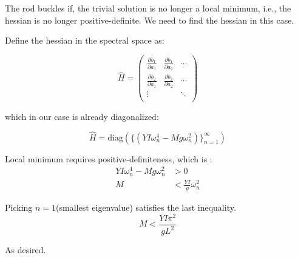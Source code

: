 \begin{framed}
The rod buckles if, the trivial solution is no longer a local minimum, i.e., the hessian is no longer positive-definite. We need to find the hessian in this case.

Define the hessian in the spectral space as:

\begin{equation}
\widehat H = 
\begin{pmatrix}
\frac{\partial b_{1}}{\partial a_1} & \frac{\partial b_{1}}{\partial a_2} & \cdots \\
\frac{\partial b_{2}}{\partial a_1} & \frac{\partial b_{2}}{\partial a_2} & \cdots \\
\vdots  & & \ddots \\
\end{pmatrix}
\end{equation}

which in our case is already diagonalized:

\begin{equation}
\widehat H = \mathrm{diag}(\{(YI\omega_n^4-Mg\omega_n^2)\}_{n=1}^{\infty})
\end{equation}

Local minimum requires positive-definiteness, which is :
\begin{equation}
\begin{aligned}
YI\omega_n^4 - Mg\omega_n^2 &> 0  \\
M &< \frac{YI}{g}\omega_n^2
\end{aligned}
\end{equation}

Picking $n=1$(smallest eigenvalue) satisfies the last inequality.
\begin{equation}
\boxed{M < \frac{YI\pi^2}{g L^2}}
\end{equation}

As desired.
\end{framed}